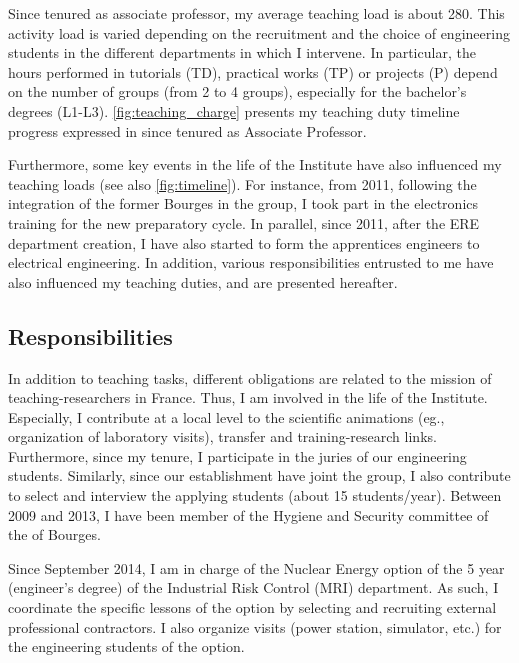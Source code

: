 \medskip

Since tenured as associate professor, my average teaching load is about \SI{280}{\hETD}.
This activity load is varied depending on the recruitment and the choice of engineering students in the different departments in which I intervene. 
In particular, the hours performed in tutorials (TD), practical works (TP) or  projects (P) depend on the number of groups (\ie from 2 to 4 groups), especially for the   bachelor's degrees (L1-L3).
\autoref{fig:teaching_charge} presents my teaching duty timeline progress expressed in \si{\hETD}  since tenured as Associate Professor.

Furthermore, some key events in the life of the Institute have also influenced my teaching loads (see also \autoref{fig:timeline}).
For instance, from 2011, following the integration of the former Bourges \ENSI  in the \INSA group,   I took part in the electronics training for the new preparatory cycle.
In parallel, since 2011, after the ERE department creation,  I have also started to form the apprentices engineers to electrical engineering.
In addition, various responsibilities entrusted to me have also influenced my teaching duties, and are presented hereafter. 

\subsection{Responsibilities}


In addition to teaching tasks, different  obligations are related to the mission of teaching-researchers in France.
Thus, I am involved in the life of the Institute. 
Especially, I contribute at a local level to the scientific animations (eg., organization of laboratory visits), transfer and training-research links. 
Furthermore, since my tenure, I participate in the juries of our engineering students.
Similarly, since our establishment have joint the \INSA group, I also contribute to select and interview the applying students (about 15 students/year).
Between 2009 and 2013, I have been member of the Hygiene and Security committee of the \ENSI of Bourges.

Since September 2014, I am in charge of the Nuclear Energy option of the 5 year (engineer's degree) of the Industrial Risk Control (MRI) department. 
As such, I coordinate the specific lessons of the option by selecting and recruiting external professional contractors. 
I also organize visits (power station, simulator, etc.) for the engineering students of the option.
 
